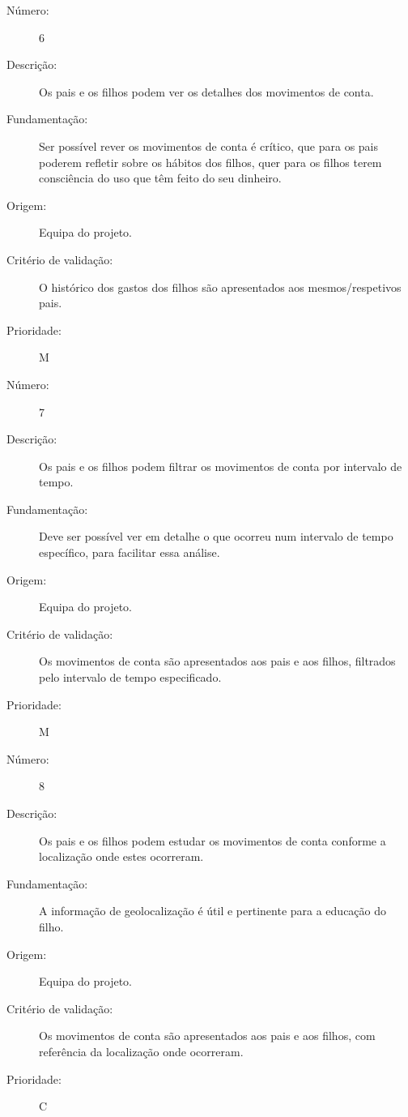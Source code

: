 \documentclass[12pt,a4paper]{article}
\begin{document}
            \begin{description}
        \item[Número:]6
        \item[Descrição:]Os pais e os filhos podem ver os detalhes dos movimentos de conta.
        \item[Fundamentação:]Ser possível rever os movimentos de conta é crítico, que para os pais poderem refletir sobre os hábitos dos filhos, quer para os filhos terem consciência do uso que têm feito do seu dinheiro.
        \item[Origem:]Equipa do projeto.
        \item[Critério de validação:]O histórico dos gastos dos filhos são apresentados aos mesmos/respetivos pais.
        \item[Prioridade:]M
      \end{description}
\vspace{0.5cm}

            \begin{description}
        \item[Número:]7
        \item[Descrição:]Os pais e os filhos podem filtrar os movimentos de conta por intervalo de tempo. 
        \item[Fundamentação:]Deve ser possível ver em detalhe o que ocorreu num intervalo de tempo específico, para facilitar essa análise.
        \item[Origem:]Equipa do projeto.
        \item[Critério de validação:] Os movimentos de conta são apresentados aos pais e aos filhos, filtrados pelo intervalo de tempo especificado.
        \item[Prioridade:]M
      \end{description}
\vspace{0.5cm}

            \begin{description}
        \item[Número:]8
        \item[Descrição:]Os pais e os filhos podem estudar os movimentos de conta conforme a localização onde estes ocorreram. 
        \item[Fundamentação:]A informação de geolocalização é útil e pertinente para a educação do filho.
        \item[Origem:]Equipa do projeto.
        \item[Critério de validação:]Os movimentos de conta são apresentados aos pais e aos filhos, com referência da localização onde ocorreram.
        \item[Prioridade:]C
      \end{description}
\vspace{0.5cm}
\end{document}
